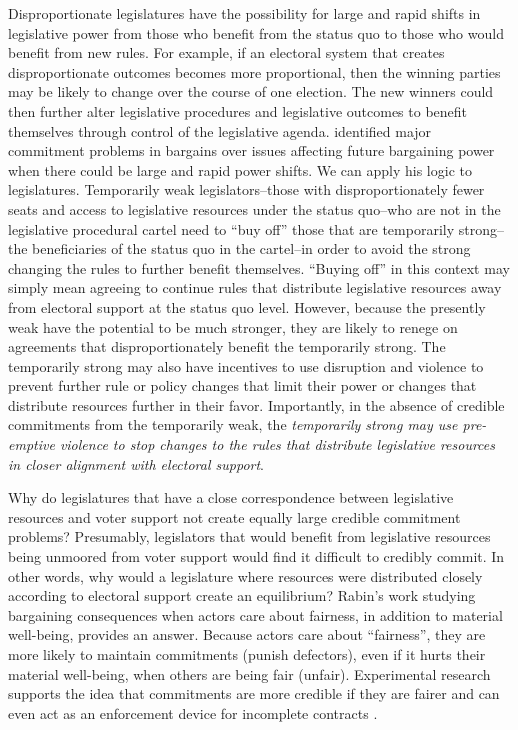 \documentclass[a4paper]{article}\usepackage[]{graphicx}\usepackage[]{color}
\begin{document}
Disproportionate legislatures have the possibility for large and rapid shifts in legislative power from those who benefit from the status quo to those who would benefit from new rules. For example, if an electoral system that creates disproportionate outcomes becomes more proportional, then the winning parties may be likely to change over the course of one election. The new winners could then further alter legislative procedures and legislative outcomes to benefit themselves through control of the legislative agenda. \cite{Powell2004,Powell2006} identified major commitment problems in bargains over issues affecting future bargaining power when there could be large and rapid power shifts. We can apply his logic to legislatures. Temporarily weak legislators--those with disproportionately fewer seats and access to legislative resources under the status quo--who are not in the legislative procedural cartel need to ``buy off'' those that are temporarily strong--the beneficiaries of the status quo in the cartel--in order to avoid the strong changing the rules to further benefit themselves. ``Buying off'' in this context may simply mean agreeing to continue rules that distribute legislative resources away from electoral support at the status quo level. However, because the presently weak have the potential to be much stronger, they are likely to renege on agreements that disproportionately benefit the temporarily strong. The temporarily strong may also have incentives to use disruption and violence to prevent further rule or policy changes that limit their power or changes that distribute resources further in their favor. Importantly, in the absence of credible commitments from the temporarily weak, the \emph{temporarily strong may use pre-emptive violence to stop changes to the rules that distribute legislative resources in closer alignment with electoral support}.

Why do legislatures that have a close correspondence between legislative resources and voter support not create equally large credible commitment problems? Presumably, legislators that would benefit from legislative resources being unmoored from voter support would find it difficult to credibly commit. In other words, why would a legislature where resources were distributed closely according to electoral support create an equilibrium? Rabin's \citeyearpar{Rabin1993} work studying bargaining consequences when actors care about fairness, in addition to material well-being, provides an answer. Because actors care about ``fairness'', they are more likely to maintain commitments (punish defectors), even if it hurts their material well-being, when others are being fair (unfair). Experimental research supports the idea that commitments are more credible if they are fairer \citep{Ellingsen2004} and can even act as an enforcement device for incomplete contracts \citep{Fehr2008}.
\end{document}
